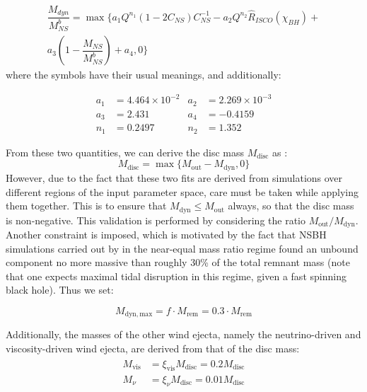     \begin{multline}
        \dfrac{M_{dyn}}{M_{NS}^b} =
            \max \biggl\{
               a_1 Q^{n_1}(1 - 2C_{NS})C^{-1}_{NS} -
               a_2 Q^{n_2} \hat{R}_{ISCO}(\chi_{BH}) + \\
               a_3\left(1 - \dfrac{M_{NS}}{M^b_{NS}}\right) +
               a_4, 0
           \biggr\}
    \end{multline}
    where the symbols have their usual meanings, and additionally:

    \begin{align*}
        a_1 &= 4.464 \times 10^{-2} & a_2 &= 2.269 \times 10^{-3} \\
        a_3 &= 2.431 & a_4 &= -0.4159 \\
        n_1 &= 0.2497 & n_2 &= 1.352
    \end{align*}

    From these two quantities, we can derive the disc mass $M_{\mathrm{disc}}$ as :
    \begin{equation}
        M_{\mathrm{disc}} = \max\{M_{\mathrm{out}} - M_{\mathrm{dyn}}, 0\}
        \label{eq:disc_mass}
    \end{equation}
    However, due to the fact that these two fits are derived from simulations over
    different regions of the input parameter space, care must be taken while applying
    them together. This is to ensure that $M_{\mathrm{dyn}} \leq M_{\mathrm{out}}$
    always, so that the disc mass is non-negative. This validation is performed by
    considering the ratio $M_{\mathrm{out}} / M_{\mathrm{dyn}}$. Another constraint is
    imposed, which is motivated by the fact that NSBH simulations carried out by
    \cite{foucart_2019} in the near-equal mass ratio regime found an unbound component
    no more massive than roughly 30\% of the total remnant mass (note that one expects
    maximal tidal disruption in this regime, given a fast spinning black hole). Thus we
    set:

    \begin{equation}
        \label{eq:constraint}
        M_{\mathrm{dyn, max}} = f \cdot M_{\mathrm{rem}} = 0.3 \cdot M_{\mathrm{rem}}
    \end{equation}


    Additionally, the masses of the other wind ejecta, namely the neutrino-driven and
    viscosity-driven wind ejecta, are derived from that of the disc mass:
    \begin{align}
        \begin{split}
            M_{\mathrm{vis}} &=
                \xi_{\mathrm{vis}}M_{\mathrm{disc}} =
                    0.2M_{\mathrm{disc}} \\
            M_{\nu} &=
                \xi_{\nu}M_{\mathrm{disc}} =
                    0.01 M_{\mathrm{disc}}
        \end{split}
    \end{align}

